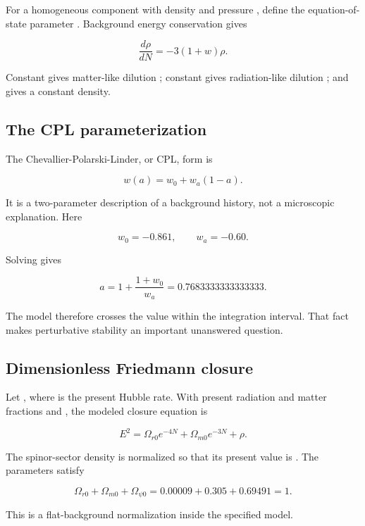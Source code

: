 \documentclass[11pt]{article}
\begin{document}
For a homogeneous component with density \texttt{} and pressure \texttt{}, define the equation-of-state parameter \texttt{}. Background energy conservation gives

\[
\frac{d\rho}{dN}=-3(1+w)\rho.
\]

Constant \texttt{} gives matter-like dilution \texttt{}; constant \texttt{} gives radiation-like dilution \texttt{}; and \texttt{} gives a constant density.

\subsection{The CPL parameterization}

The Chevallier-Polarski-Linder, or CPL, form is

\[
w(a)=w_0+w_a(1-a).
\]

It is a two-parameter description of a background history, not a microscopic explanation. Here

\[
w_0=-0.861,\qquad w_a=-0.60.
\]

Solving \texttt{} gives

\[
a=1+\frac{1+w_0}{w_a}=0.7683333333333333.
\]

The model therefore crosses the value \texttt{} within the integration interval. That fact makes perturbative stability an important unanswered question.

\subsection{Dimensionless Friedmann closure}

Let \texttt{}, where \texttt{} is the present Hubble rate. With present radiation and matter fractions \texttt{} and \texttt{}, the modeled closure equation is

\[
E^2=\Omega_{r0}e^{-4N}+\Omega_{m0}e^{-3N}+\rho.
\]

The spinor-sector density is normalized so that its present value is \texttt{}. The parameters satisfy

\[
\Omega_{r0}+\Omega_{m0}+\Omega_{\psi0}
=0.00009+0.305+0.69491=1.
\]

This is a flat-background normalization inside the specified model.
\end{document}
